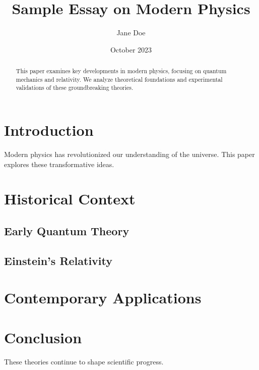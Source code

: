 \documentclass{article}
\title{Sample Essay on Modern Physics}
\author{Jane Doe}
\date{October 2023}
\begin{document}
\maketitle

\begin{abstract}
This paper examines key developments in modern physics, focusing on quantum mechanics and relativity. We analyze theoretical foundations and experimental validations of these groundbreaking theories.
\end{abstract}

\section{Introduction}
Modern physics has revolutionized our understanding of the universe. \lipsum[1][1-3] This paper explores these transformative ideas.

\section{Historical Context}
\lipsum[2]

\subsection{Early Quantum Theory}
\lipsum[3][1-4]

\subsection{Einstein's Relativity}
\lipsum[4][1-3]

\section{Contemporary Applications}
\lipsum[5-6]

\section{Conclusion}
These theories continue to shape scientific progress. \lipsum[7][1-2]


 
\end{document}
